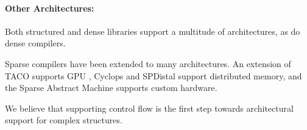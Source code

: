 \paragraph{Other Architectures:} 

Both structured and dense libraries support a multitude of architectures, as do dense compilers.

Sparse compilers have been extended to many architectures. An extension of TACO supports GPU \cite{senanayake2020sparse}, Cyclops\cite{solomonik_cyclops_2013,solomonik_sparse_2015} and SPDistal\cite{yadav_spdistal_2022-1} support distributed memory, and the Sparse Abstract Machine\cite{hsu_sparse_2022} supports custom hardware.

We believe that supporting control flow is the first step towards architectural support for complex structures.

%





